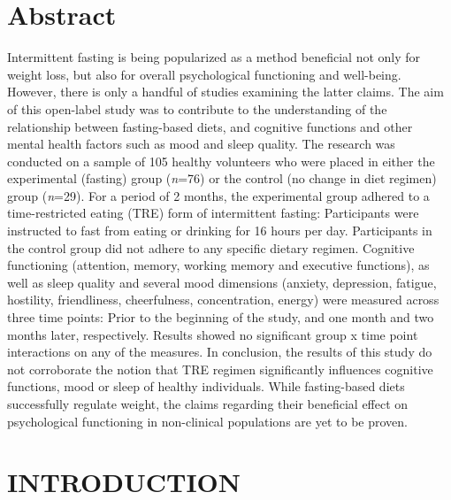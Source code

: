 \documentclass[authordate, empirical]{jote-new-article}
\begin{document}
\section{Abstract}



Intermittent fasting is being popularized as a method beneficial not only for weight loss, but also for overall psychological functioning and well-being. However, there is only a handful of studies examining the latter claims. The aim of this open-label study was to contribute to the understanding of the relationship between fasting-based diets, and cognitive functions and other mental health factors such as mood and sleep quality. The research was conducted on a sample of 105 healthy volunteers who were placed in either the experimental (fasting) group (\emph{n}=76) or the control (no change in diet regimen) group (\emph{n}=29). For a period of 2 months, the experimental group adhered to a time-restricted eating (TRE) form of intermittent fasting: Participants were instructed to fast from eating or drinking for 16 hours per day. Participants in the control group did not adhere to any specific dietary regimen. Cognitive functioning (attention, memory, working memory and executive functions), as well as sleep quality and several mood dimensions (anxiety, depression, fatigue, hostility, friendliness, cheerfulness, concentration, energy) were measured across three time points: Prior to the beginning of the study, and one month and two months later, respectively. Results showed no significant group x time point interactions on any of the measures. In conclusion, the results of this study do not corroborate the notion that TRE regimen significantly influences cognitive functions, mood or sleep of healthy individuals. While fasting-based diets successfully regulate weight, the claims regarding their beneficial effect on psychological functioning in non-clinical populations are yet to be proven.



\section{INTRODUCTION}
\end{document}
